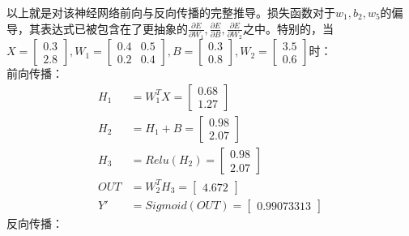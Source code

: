 \documentclass{article}
\begin{document}
以上就是对该神经网络前向与反向传播的完整推导。损失函数对于$ w_1,b_2,w_5 $的偏导，其表达式已被包含在了更抽象的$ \frac{\partial{E}}{\partial{W_1}}, \frac{\partial{E}}{\partial{B}},\frac{\partial{E}}{\partial{W_2}}$之中。特别的，当
$  X=\begin{bmatrix}0.3\\2.8\end{bmatrix}, W_1=\begin{bmatrix}0.4& 0.5\\0.2 & 0.4\end{bmatrix}, B=\begin{bmatrix}0.3\\0.8\end{bmatrix}, W_2=\begin{bmatrix}3.5\\0.6\end{bmatrix}$时：\\
前向传播：
\begin{equation}
	\begin{aligned}
		H_1 &= W_1^TX =\begin{bmatrix}0.68\\1.27\end{bmatrix}\\
		H_2 &= H_1+B=\begin{bmatrix}0.98\\2.07\end{bmatrix}\\
		H_3 &= Relu(H_2)=\begin{bmatrix}0.98\\2.07\end{bmatrix}\\
		OUT &= W_2^TH_3=\begin{bmatrix}4.672\end{bmatrix}\\
		Y' &= Sigmoid(OUT)=\begin{bmatrix}0.99073313\end{bmatrix}
	\end{aligned}
\end{equation}
反向传播：
\end{document}
